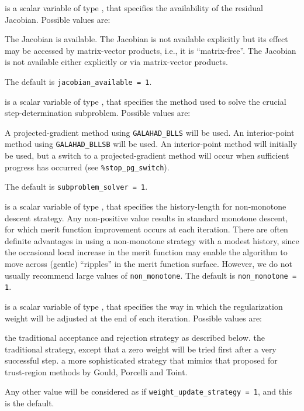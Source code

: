 \documentclass{galahad}
\begin{document}
\begin{description}
 is a scalar variable of type \integer,
that specifies the availability of the residual Jacobian.
Possible values are:

\begin{description}
 The Jacobian is available.
 The Jacobian is not available explicitly but its effect
may be accessed by matrix-vector products, i.e., it is ``matrix-free''.
 The Jacobian is not available either explicitly or via
matrix-vector products.
\end{description}
The default is {\tt jacobian\_available = 1}.

 is a scalar variable of type \integer, that
specifies the method used to solve the crucial step-determination
subproblem. Possible values are:
\begin{description}
 A projected-gradient method using {\tt GALAHAD\_BLLS} 
will be used.
 An interior-point method using {\tt GALAHAD\_BLLSB} will be used.
 An interior-point method will initially be used, but a
switch to a projected-gradient method will occur when sufficient progress
has occurred (see {\tt \%stop\_pg\_switch}).
\end{description}
The default is {\tt subproblem\_solver = 1}.

 is a scalar variable of type \integer, that
specifies the history-length for non-monotone descent strategy.
Any non-positive value results in standard monotone descent, for which
merit function improvement occurs at each iteration. There are often
definite advantages in using a non-monotone strategy with a modest history,
since the occasional local increase in the merit function may
enable the algorithm to move across (gentle) ``ripples'' in
the merit function surface.
However, we do not usually recommend large values of {\tt non\_monotone}.
The default is {\tt non\_monotone = 1}.

 is a scalar variable of type \integer,
that specifies the way in which the regularization weight will be adjusted
at the end of each iteration. Possible values are:
\begin{description}
 the traditional acceptance and rejection strategy as described below.
 the traditional strategy, except that a zero weight will be tried
first after a very successful step.
 a more sophisticated strategy that mimics that proposed
for trust-region methods by Gould, Porcelli and Toint.
\end{description}
Any other value will be considered as if {\tt weight\_update\_strategy = 1},
and this is the default.


\end{description}
\end{document}
